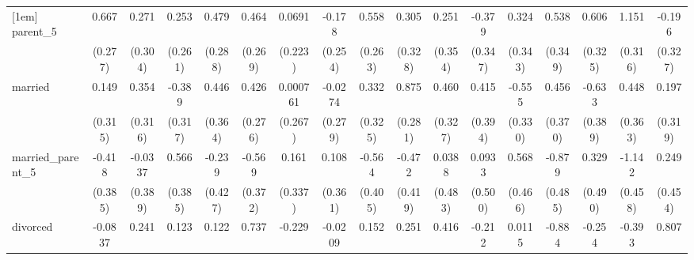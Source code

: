 {\begin{tabular}{l*{16}{c}}
[1em]
parent\_5            &       0.667\sym{*}  &       0.271         &       0.253         &       0.479         &       0.464         &      0.0691         &      -0.178         &       0.558\sym{*}  &       0.305         &       0.251         &      -0.379         &       0.324         &       0.538         &       0.606         &       1.151\sym{***}&      -0.196         \\
                    &     (0.277)         &     (0.304)         &     (0.261)         &     (0.288)         &     (0.269)         &     (0.223)         &     (0.254)         &     (0.263)         &     (0.328)         &     (0.354)         &     (0.347)         &     (0.343)         &     (0.349)         &     (0.325)         &     (0.316)         &     (0.327)         \\
[1em]
married             &       0.149         &       0.354         &      -0.389         &       0.446         &       0.426         &    0.000761         &     -0.0274         &       0.332         &       0.875\sym{**} &       0.460         &       0.415         &      -0.555         &       0.456         &      -0.633         &       0.448         &       0.197         \\
                    &     (0.315)         &     (0.316)         &     (0.317)         &     (0.364)         &     (0.276)         &     (0.267)         &     (0.279)         &     (0.325)         &     (0.281)         &     (0.327)         &     (0.394)         &     (0.330)         &     (0.370)         &     (0.389)         &     (0.363)         &     (0.319)         \\
[1em]
married\_parent\_5    &      -0.418         &     -0.0337         &       0.566         &      -0.239         &      -0.569         &       0.161         &       0.108         &      -0.564         &      -0.472         &      0.0388         &      0.0933         &       0.568         &      -0.879         &       0.329         &      -1.142\sym{*}  &       0.249         \\
                    &     (0.385)         &     (0.389)         &     (0.385)         &     (0.427)         &     (0.372)         &     (0.337)         &     (0.361)         &     (0.405)         &     (0.419)         &     (0.483)         &     (0.500)         &     (0.466)         &     (0.485)         &     (0.490)         &     (0.458)         &     (0.454)         \\
[1em]
divorced            &     -0.0837         &       0.241         &       0.123         &       0.122         &       0.737\sym{*}  &      -0.229         &     -0.0209         &       0.152         &       0.251         &       0.416         &      -0.212         &      0.0115         &      -0.884\sym{*}  &      -0.254         &      -0.393         &       0.807\sym{*}  \\

\end{tabular}}
